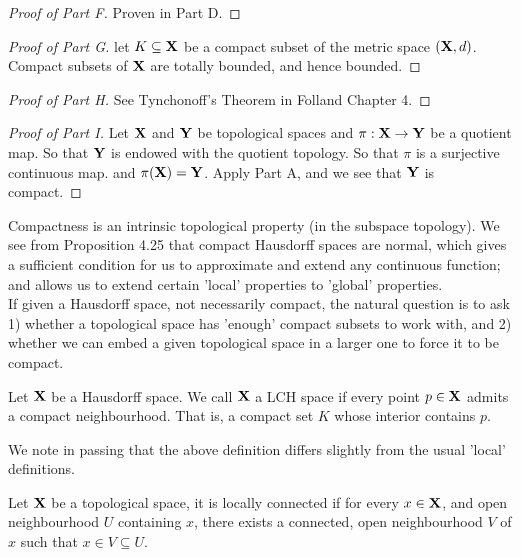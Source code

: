 \documentclass[../main-manifolds.tex]{subfiles}
\begin{document}
\begin{proof}[Proof of  Part F]
    Proven in Part D.
\end{proof}
    
\begin{proof}[Proof of  Part G]
    let $K\subseteq {\mathbf{X}}$ be a compact subset of the metric space $({\mathbf{X}},d)$. Compact subsets of ${\mathbf{X}}$ are totally bounded, and hence bounded.
\end{proof}

\begin{proof}[Proof of  Part H]
    See Tynchonoff's Theorem in Folland Chapter 4.
\end{proof}

\begin{proof}[Proof of  Part I]
    Let ${\mathbf{X}}$ and ${\mathbf{Y}}$ be topological spaces and $\pi: {\mathbf{X}}\to{\mathbf{Y}}$ be a quotient map. So that ${\mathbf{Y}}$ is endowed with the quotient topology. So that $\pi$ is a surjective continuous map. and $\pi({\mathbf{X}})={\mathbf{Y}}$. Apply Part A, and we see that ${\mathbf{Y}}$ is compact.
\end{proof}

\newpage

Compactness is an intrinsic topological property (in the subspace topology). We see from Proposition 4.25 that compact Hausdorff spaces are normal, which gives a sufficient condition for us to approximate and extend any continuous function; and allows us to extend certain 'local' properties to 'global' properties. \\

If given a Hausdorff space, not necessarily compact, the natural question is to ask 1) whether a topological space has 'enough' compact subsets to work with, and 2) whether we can embed a given topological space in a larger one to force it to be compact.

\begin{definition}\label{chp4:LCH-definition}
    Let ${\mathbf{X}}$ be a Hausdorff space. We call ${\mathbf{X}}$ a LCH space if every point $p\in{\mathbf{X}}$ admits a compact neighbourhood. That is, a compact set $K$ whose interior contains $p$.
\end{definition} 

We note in passing that the above definition differs slightly from the usual 'local' definitions.

\begin{definition}\label{chp4:locally-connected-definition}
    Let ${\mathbf{X}}$ be a topological space, it is locally connected if for every $x\in{\mathbf{X}}$, and open neighbourhood $U$ containing $x$, there exists a connected, open neighbourhood $V$ of $x$ such that $x\in V\subseteq U$.
\end{definition}
\end{document}
